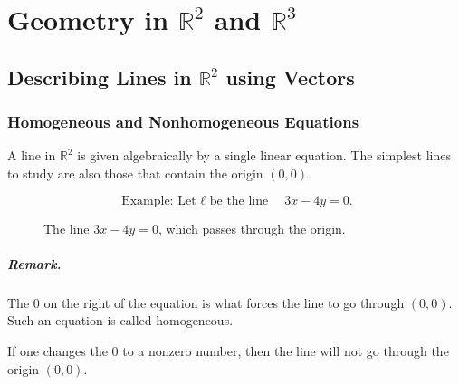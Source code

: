 
\chapter{Geometry in $\mathbb{R}^2$ and $\mathbb{R}^3$}

\section{Describing Lines in $\mathbb{R}^2$ using Vectors}

\subsection{Homogeneous and Nonhomogeneous Equations}

A line in $\mathbb{R}^2$ is given algebraically by a single linear equation.
The simplest lines to study are also those that contain the origin $(0,0)$.

$$
\text{Example: Let $\ell$ be the line}
\quad 
3x-4y=0.
$$

\begin{figure}[h]
\centering
{}
\caption{The line $3x-4y=0$, which passes through the origin.}
\end{figure}

\paragraph{Remark.}
The $0$ on the right of the equation is what forces the line to go through
$(0,0)$. Such an equation is called homogeneous.

If one changes the $0$ to a nonzero number, then the line will not go through
the origin $(0,0)$.

